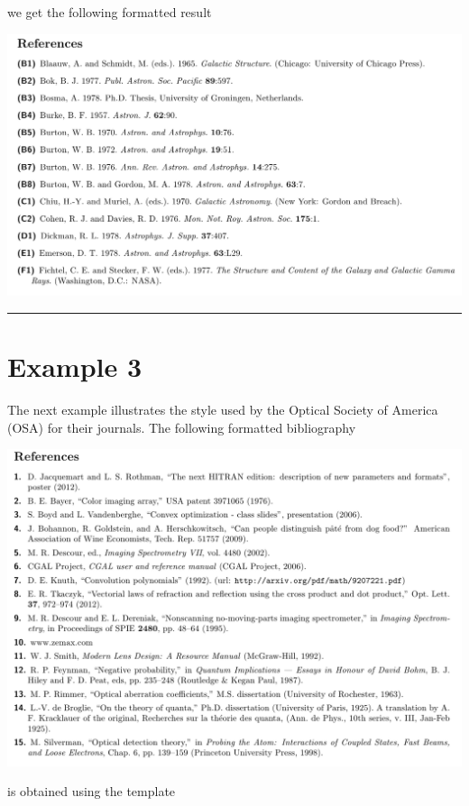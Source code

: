 \documentclass[letterpaper,10pt,english]{sphinxmanual}
\begin{document}
we get the following formatted result

\includegraphics[width=0.600\linewidth]{example2b.png}


\bigskip\hrule{}\bigskip



\section{Example 3}
\label{examples:example-3}
The next example illustrates the style used by the Optical Society of America (OSA) for their journals. The following formatted bibliography

\includegraphics[width=0.600\linewidth]{example3.png}

is obtained using the template
\end{document}
